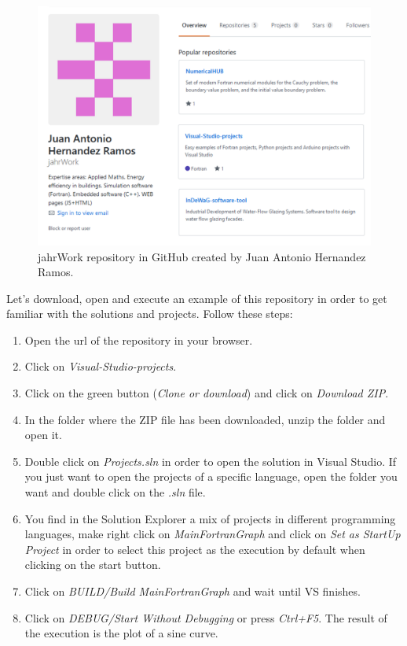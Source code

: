 \begin{figure}
    \centering
    \includegraphics[width= \textwidth]{Figures/repository2}
    \caption{jahrWork repository in GitHub created by Juan Antonio Hernandez Ramos.}
    \label{fig:repository}
\end{figure}

Let's download, open and execute an example of this repository in order to get familiar with the solutions and projects. Follow these steps:

\begin{enumerate}[nosep]
    \item Open the url of the repository in your browser.
    \item Click on \textit{Visual-Studio-projects}.
    \item Click on the green button (\textit{Clone or download}) and click on \textit{Download ZIP}.
    \item In the folder where the ZIP file has been downloaded, unzip the folder and open it. 
    \item Double click on \textit{Projects.sln} in order to open the solution in Visual Studio. If you just want to open the projects of a specific language, open the folder you want and double click on the \textit{.sln} file.
    \item You find in the Solution Explorer a mix of projects in different programming languages, make right click on \textit{MainFortranGraph} and click on \textit{Set as StartUp Project} in order to select this project as the execution by default when clicking on the start button.
    \item Click on \textit{BUILD/Build MainFortranGraph} and wait until VS finishes.
    \item Click on \textit{DEBUG/Start Without Debugging} or press \textit{Ctrl+F5}. The result of the execution is the plot of a sine curve.
\end{enumerate}
 

